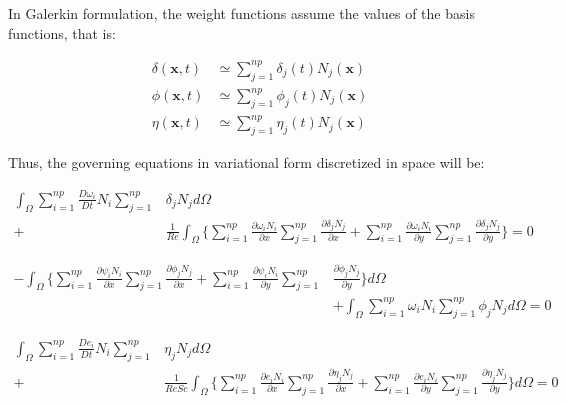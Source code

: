 \medskip
In Galerkin formulation, the weight functions assume 
the values of the basis functions, that is:

\begin{align}
 \delta(\textbf{x},t) & \simeq \sum\limits_{j=1}^{np} \delta_j(t) N_j(\textbf{x}) \\
 \phi(\textbf{x},t) & \simeq \sum\limits_{j=1}^{np} \phi_j(t) N_j(\textbf{x}) \\
 \eta(\textbf{x},t) & \simeq \sum\limits_{j=1}^{np} \eta_j(t) N_j(\textbf{x})
\end{align}

\noindent
Thus, the governing equations in variational form 
discretized in space will be:

\begin{equation} \label{convection vorticity}
 \begin{aligned} 
  \int_{\Omega} \sum\limits_{i=1}^{np} \frac{D \omega_i}{Dt} N_i 
                \sum\limits_{j=1}^{np} & \delta_j N_j d\Omega 
  \\[5pt]
  + & \frac{1}{\textit{Re}} \int_{\Omega} \Bigg\{ 
                    \sum\limits_{i=1}^{np} \frac{\partial \omega_i N_i}{\partial x} 
                    \sum\limits_{j=1}^{np} \frac{\partial \delta_j N_j}{\partial x} 
  +                 \sum\limits_{i=1}^{np} \frac{\partial \omega_i N_i}{\partial y} 
                    \sum\limits_{j=1}^{np} \frac{\partial \delta_j N_j}{\partial y} \Bigg\}
 = 0
 \end{aligned}
\end{equation}

\begin{equation}
 \begin{aligned}
  - \int_{\Omega} \Bigg\{ 
                  \sum\limits_{i=1}^{np} \frac{\partial \psi_i N_i}{\partial x} 
                  \sum\limits_{j=1}^{np} \frac{\partial \phi_j N_j}{\partial x} 
  +               \sum\limits_{i=1}^{np} \frac{\partial \psi_i N_i}{\partial y} 
                  \sum\limits_{j=1}^{np} & \frac{\partial \phi_j N_j}{\partial y} 
  \Bigg\} d\Omega 
  \\[5pt]
  & + \int_{\Omega} \sum\limits_{i=1}^{np} \omega_i N_i 
                  \sum\limits_{j=1}^{np} \phi_j N_j d\Omega = 0
 \end{aligned}
\end{equation}

\begin{equation} \label{convection concentration}
 \begin{aligned} 
  \int_{\Omega} \sum\limits_{i=1}^{np} \frac{D e_i}{Dt} N_i 
                \sum\limits_{j=1}^{np} & \eta_j N_j d\Omega 
  \\[5pt]
  + & \frac{1}{\textit{ReSc}} \int_{\Omega} \Bigg\{ 
                    \sum\limits_{i=1}^{np} \frac{\partial e_i N_i}{\partial x} 
                    \sum\limits_{j=1}^{np} \frac{\partial \eta_j N_j}{\partial x} 
  +                 \sum\limits_{i=1}^{np} \frac{\partial e_i N_i}{\partial y} 
                    \sum\limits_{j=1}^{np} \frac{\partial \eta_j N_j}{\partial y} \Bigg\} d\Omega
 = 0
 \end{aligned}
\end{equation}

